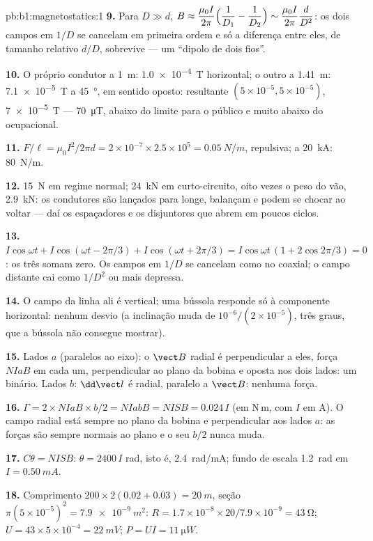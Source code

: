 \begin{solution}{pb:b1:magnetostatics:1}
\textbf{9.} Para $D \gg d$, $B \approx \dfrac{\mu_0I}{2\pi}\Bigl(\dfrac1{D_1} - \dfrac1{D_2}\Bigr)
\sim \dfrac{\mu_0I}{2\pi}\dfrac{d}{D^2}$: os dois campos em $1/D$ se cancelam em primeira
ordem e só a diferença entre eles, de tamanho relativo $d/D$, sobrevive --- um
``dipolo de dois fios''.

\textbf{10.} O próprio condutor a \qty{1}{m}: \qty{1.0e-4}{T} horizontal; o outro
a \qty{1.41}{m}: \qty{7.1e-5}{T} a \qty{45}{\degree}, em sentido oposto: resultante
$(5 \times 10^{-5}, 5 \times 10^{-5})$, \qty{7e-5}{T} --- \qty{70}{\micro T}, abaixo do
limite para o público e muito abaixo do ocupacional.

\textbf{11.} $F/\ell = \mu_0I^2/2\pi d = 2 \times 10^{-7} \times 2.5 \times 10^5 =
\qty{0.05}{N/m}$, repulsiva; a \qty{20}{kA}: \qty{80}{N/m}.

\textbf{12.} \qty{15}{N} em regime normal; \qty{24}{kN} em curto-circuito, oito vezes
o peso do vão, \qty{2.9}{kN}: os condutores são lançados para longe, balançam
e podem se chocar ao voltar --- daí os espaçadores e os disjuntores que
abrem em poucos ciclos.

\textbf{13.} $I\cos\omega t + I\cos(\omega t - 2\pi/3) + I\cos(\omega t + 2\pi/3) =
I\cos\omega t\,(1 + 2\cos2\pi/3) = 0$: os três  somam zero. Os
campos em $1/D$ se cancelam como no coaxial; o campo distante cai como $1/D^2$ ou
mais depressa.

\textbf{14.} O campo da linha ali é vertical; uma bússola responde só à
componente horizontal: nenhum desvio (a inclinação muda de
$10^{-6}/(2 \times 10^{-5})$, três graus, que a bússola não consegue mostrar).

\textbf{15.} Lados $a$ (paralelos ao eixo): o $\vect B$ radial é
perpendicular a eles, força $NIaB$ em cada um, perpendicular ao
plano da bobina e oposta nos dois lados: um binário. Lados $b$: $\dd\vect l$
é radial, paralelo a $\vect B$: nenhuma força.

\textbf{16.} $\Gamma = 2 \times NIaB \times b/2 = NIabB = NISB = 0.024\,I$ (em N\,m, com $I$
em A). O campo radial está sempre no plano da bobina e perpendicular
aos lados $a$: as forças são sempre normais ao plano e o seu  $b/2$ nunca muda.

\textbf{17.} $C\theta = NISB$: $\theta = 2400\,I$ rad, isto é, \qty{2.4}{rad/mA}; fundo
de escala \qty{1.2}{rad} em $I = \qty{0.50}{mA}$.

\textbf{18.} Comprimento $200 \times 2(0.02 + 0.03) = \qty{20}{m}$, seção $\pi(5 \times
10^{-5})^2 = \qty{7.9e-9}{m^2}$: $R = 1.7 \times 10^{-8} \times 20/7.9 \times 10^{-9} =
\qty{43}{\ohm}$; $U = 43 \times 5 \times 10^{-4} = \qty{22}{mV}$; $P = UI = \qty{11}{\micro W}$.


\end{solution}
